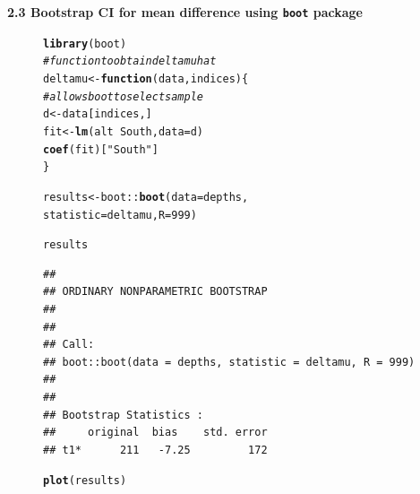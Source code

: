 \documentclass[10pt,handout]{beamer}\usepackage[]{graphicx}\usepackage[]{color}
\makeatletter
\newcommand{\hlnum}[1]{\textcolor[rgb]{0.686,0.059,0.569}{#1}}%
\newcommand{\hlstr}[1]{\textcolor[rgb]{0.192,0.494,0.8}{#1}}%
\newcommand{\hlcom}[1]{\textcolor[rgb]{0.678,0.584,0.686}{\textit{#1}}}%
\newcommand{\hlopt}[1]{\textcolor[rgb]{0,0,0}{#1}}%
\newcommand{\hlstd}[1]{\textcolor[rgb]{0.345,0.345,0.345}{#1}}%
\newcommand{\hlkwa}[1]{\textcolor[rgb]{0.161,0.373,0.58}{\textbf{#1}}}%
\newcommand{\hlkwb}[1]{\textcolor[rgb]{0.69,0.353,0.396}{#1}}%
\newcommand{\hlkwc}[1]{\textcolor[rgb]{0.333,0.667,0.333}{#1}}%
\newcommand{\hlkwd}[1]{\textcolor[rgb]{0.737,0.353,0.396}{\textbf{#1}}}%
\newenvironment{kframe}{%
 \def\at@end@of@kframe{}%
 \ifinner\ifhmode%
  \def\at@end@of@kframe{\end{minipage}}%
  \begin{minipage}{\columnwidth}%
 \fi\fi%
 \def\FrameCommand##1{\hskip\@totalleftmargin \hskip-\fboxsep
 \colorbox{shadecolor}{##1}\hskip-\fboxsep
     \hskip-\linewidth \hskip-\@totalleftmargin \hskip\columnwidth}%
 \MakeFramed {\advance\hsize-\width
   \@totalleftmargin\z@ \linewidth\hsize
   \@setminipage}}%
 {\par\unskip\endMakeFramed%
 \at@end@of@kframe}
\newenvironment{knitrout}{}{} %
\makeatother
\begin{document}
\begin{frame}
	\textbf{2.3 Bootstrap CI for mean difference using \texttt{boot} package}
	\begin{figure}
		\begin{minipage}[h]{0.40\linewidth}
\begin{knitrout}\tiny
{}\color{fgcolor}\begin{kframe}
\begin{alltt}
\hlkwd{library}\hlstd{(boot)}
\hlcom{# function to obtain deltamu hat}
\hlstd{deltamu} \hlkwb{<-} \hlkwa{function}\hlstd{(}\hlkwc{data}\hlstd{,} \hlkwc{indices}\hlstd{) \{}
\hlcom{# allows boot to select sample}
\hlstd{d} \hlkwb{<-} \hlstd{data[indices,]}
\hlstd{fit} \hlkwb{<-} \hlkwd{lm}\hlstd{(alt} \hlopt{~} \hlstd{South,} \hlkwc{data}\hlstd{=d)}
\hlkwd{coef}\hlstd{(fit)[}\hlstr{"South"}\hlstd{]}
\hlstd{\}}

\hlstd{results} \hlkwb{<-} \hlstd{boot}\hlopt{::}\hlkwd{boot}\hlstd{(}\hlkwc{data} \hlstd{= depths,}
\hlkwc{statistic} \hlstd{= deltamu,} \hlkwc{R}\hlstd{=}\hlnum{999}\hlstd{)}

\hlstd{results}
\end{alltt}
\begin{verbatim}
## 
## ORDINARY NONPARAMETRIC BOOTSTRAP
## 
## 
## Call:
## boot::boot(data = depths, statistic = deltamu, R = 999)
## 
## 
## Bootstrap Statistics :
##     original  bias    std. error
## t1*      211   -7.25         172
\end{verbatim}
\end{kframe}
\end{knitrout}
			
		\end{minipage}
		\hspace{0.4cm}
		\begin{minipage}[h]{0.50\linewidth}
\begin{knitrout}\tiny
{}\color{fgcolor}\begin{kframe}
\begin{alltt}
\hlkwd{plot}\hlstd{(results)}
\end{alltt}
\end{kframe}


\end{knitrout}
\end{minipage}
\end{figure}
\end{frame}
\end{document}
